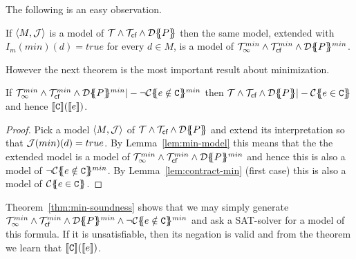The following is an easy observation. 
\begin{lemma}\label{lem:min-model} If $\langle M,{\cal J}\rangle$ is a model of ${\cal T} \land {\cal T}_{\textsf{cf}} \land {\cal D}\{\!\!\{P\}\!\!\}$ then the same model, extended with
$I_m(min)(d) = true$ for every $d \in M$, is a model of ${\cal T}_{\infty}^{min} \land {\cal T}_{\textsf{cf}}^{min} \land {\cal D}\{\!\!\{P\}\!\!\}^{min}$. 
\end{lemma}
However the next theorem is the most important result about minimization. 
\begin{theorem}\label{thm:min-soundness} If $\ThMin\land \Th_{\lcfZ}^{min} \land \dtrans{}{P}^{min} |- \neg \ctransmin{}{}{e \notin \Ct}$ then 
                   $\Th \land \Th_{\lcfZ} \land \dtrans{}{P} |- \ctrans{}{}{e \in \Ct}$ and hence $[\![{\tt C}]\!]([\![e]\!])$.
\end{theorem}
\begin{proof}
Pick a model $\langle M, {\cal J}\rangle$ of ${\cal T} \land {\cal T}_{\textsf{cf}} \land {\cal D}\{\!\!\{P\}\!\!\}$ and extend its interpretation 
so that ${\cal J}(min)(d) = true$. By Lemma~\ref{lem:min-model} this means that the the extended model is a model of 
${\cal T}_{\infty}^{min}\land {\cal T}_{\textsf{cf}}^{min} \land {\cal D}\{\!\!\{P\}\!\!\}^{min}$ and hence this is also a model of $\neg {\cal C}\{\!\!\{e \notin {\tt C}\}\!\!\}_{}^{min}$. 
By Lemma~\ref{lem:contract-min} (first case) this is also a model of ${\cal C}\{\!\!\{e \in {\tt C}\}\!\!\}_{}$.
\end{proof} 
Theorem~\ref{thm:min-soundness} shows that we may simply generate $\ThMin \land \Th_{\lcfZ}^{min} \land \dtrans{}{P}^{min} \land \neg \ctransmin{}{}{e \notin \Ct}$
and ask a SAT-solver for a model of this formula. If it is unsatisfiable, then its negation is valid and from the theorem we learn that $[\![{\tt C}]\!]([\![e]\!])$.





